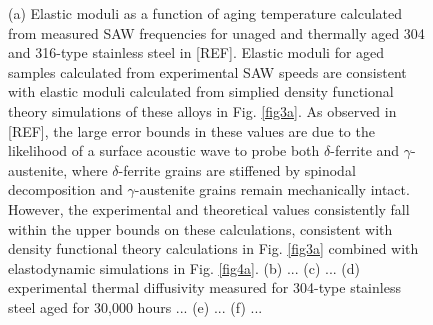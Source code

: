 \begin{figure}
	\caption{(a) Elastic moduli as a function of aging temperature calculated from measured SAW frequencies for unaged and thermally aged 304 and 316-type stainless steel in [REF]. Elastic moduli for aged samples calculated from experimental SAW speeds are consistent with elastic moduli calculated from simplied density functional theory simulations of these alloys in Fig. \ref{fig3a}. As observed in [REF], the large error bounds in these values are due to the likelihood of a surface acoustic wave to probe both $\delta$-ferrite and $\gamma$-austenite, where $\delta$-ferrite grains are stiffened by spinodal decomposition and $\gamma$-austenite grains remain mechanically intact. However, the experimental and theoretical values consistently fall within the upper bounds on these calculations, consistent with density functional theory calculations in Fig. \ref{fig3a} combined with elastodynamic simulations in Fig. \ref{fig4a}. (b) ... (c) ... (d) experimental thermal diffusivity measured for 304-type stainless steel aged for 30,000 hours ... (e) ... (f) ...}
	\label{fig5}
\end{figure}